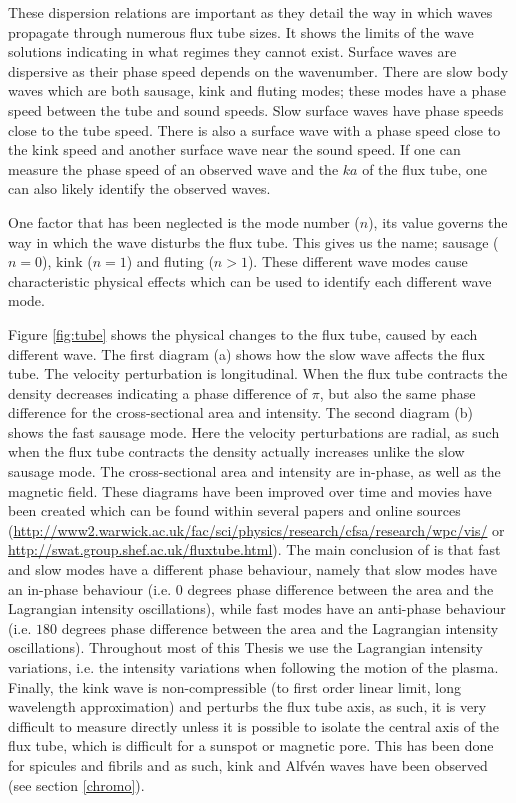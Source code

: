     These dispersion relations are important as they detail the way in which waves propagate through numerous flux tube sizes.
    It shows the limits of the wave solutions indicating in what regimes they cannot exist.
    Surface waves are dispersive as their phase speed depends on the wavenumber.
    There are slow body waves which are both sausage, kink and fluting modes; these modes have a phase speed between the tube and sound speeds.
    Slow surface waves have phase speeds close to the tube speed. 
    There is also a surface wave with a phase speed close to the kink speed and another surface wave near the sound speed.
    If one can measure the phase speed of an observed wave and the $ka$ of the flux tube, one can also likely identify the observed waves.
    
    One factor that has been neglected is the mode number ($n$), its value governs the way in which the wave disturbs the flux tube.
    This gives us the name; sausage ($n=0$), kink ($n=1$) and fluting ($n>1$).
    These different wave modes cause characteristic physical effects which can be used to identify each different wave mode.
    
    Figure \ref{fig:tube} shows the physical changes to the flux tube, caused by each different wave.
    The first diagram (a) shows how the slow wave affects the flux tube. 
    The velocity perturbation is longitudinal.
    When the flux tube contracts the density decreases indicating a phase difference of $\pi$, but also the same phase difference for the cross-sectional area and intensity.
    The second diagram (b) shows the fast sausage mode.
    Here the velocity perturbations are radial, as such when the flux tube contracts the density actually increases unlike the slow sausage mode.
    The cross-sectional area and intensity are in-phase, as well as the magnetic field.
    These diagrams have been improved over time and movies have been created which can be found within several papers \citep{Morton2012,jess2015multiwavelength} and online sources (\url{http://www2.warwick.ac.uk/fac/sci/physics/research/cfsa/research/wpc/vis/} or \url{http://swat.group.shef.ac.uk/fluxtube.html}).
    The main conclusion of \citet{Moreels2013b} is that fast and slow modes have a different phase behaviour, namely that slow modes have an in-phase behaviour (i.e. $0$ degrees phase difference between the area and the Lagrangian intensity oscillations), while fast modes have an anti-phase behaviour (i.e. $180$ degrees phase difference between the area and the Lagrangian intensity oscillations).
    Throughout most of this Thesis we use the Lagrangian intensity variations, i.e. the intensity variations when following the motion of the plasma. 
    Finally, the kink wave is non-compressible (to first order linear limit, long wavelength approximation) and perturbs the flux tube axis, as such, it is very difficult to measure directly unless it is possible to isolate the central axis of the flux tube, which is difficult for a sunspot or magnetic pore.
    This has been done for spicules and fibrils and as such, kink and Alfv\'en waves have been observed (see section \ref{chromo}).
  
